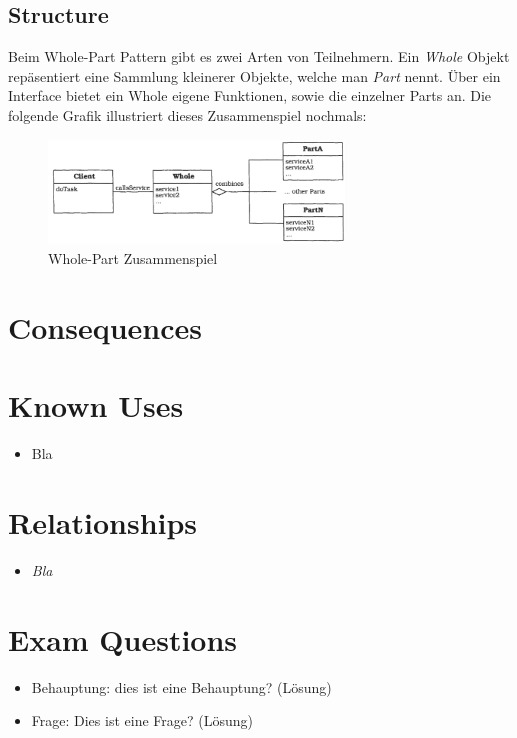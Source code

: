 \subsection{Structure}
Beim Whole-Part Pattern gibt es zwei Arten von Teilnehmern.
Ein \textit{Whole} Objekt repäsentiert eine Sammlung kleinerer Objekte, welche man  \textit{Part} nennt. Über ein Interface bietet ein Whole eigene Funktionen, sowie die einzelner Parts an. Die folgende Grafik illustriert dieses Zusammenspiel nochmals:
\begin{figure}[H]
	\centering
	\includegraphics[width=0.7\textwidth]{figures/07-wholepart-1}
	\caption{Whole-Part Zusammenspiel}
\end{figure}

\section{Consequences}
\begin{itemize}
\end{itemize}

\section{Known Uses}
\begin{itemize}
	\item Bla
\end{itemize}

\section{Relationships}
\begin{itemize}
	\item \textit{Bla}
\end{itemize}

\section{Exam Questions}
\begin{itemize}
  \item Behauptung: dies ist eine Behauptung? (Lösung)
    \item Frage: Dies ist eine Frage? (Lösung)
\end{itemize}
